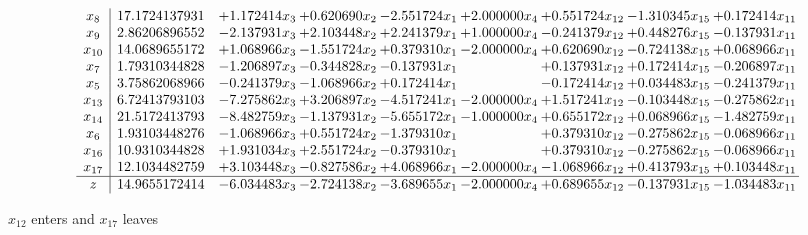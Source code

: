 \documentclass[10pt]{article}
\begin{document}
 \[\begin{array}{c| c c@{\hskip 2pt} c@{\hskip 2pt} c@{\hskip 2pt} c@{\hskip 2pt} c@{\hskip 2pt} c@{\hskip 2pt} c@{\hskip 2pt} }
 x_{8}   &  17.1724137931 & + 1.172414 x_{3} & + 0.620690 x_{2} & -2.551724 x_{1} & + 2.000000 x_{4} & + 0.551724 x_{12} & -1.310345 x_{15} & + 0.172414 x_{11}\\
 x_{9}   &  2.86206896552 & -2.137931 x_{3} & + 2.103448 x_{2} & + 2.241379 x_{1} & + 1.000000 x_{4} & -0.241379 x_{12} & + 0.448276 x_{15} & -0.137931 x_{11}\\
 x_{10}   &  14.0689655172 & + 1.068966 x_{3} & -1.551724 x_{2} & + 0.379310 x_{1} & -2.000000 x_{4} & + 0.620690 x_{12} & -0.724138 x_{15} & + 0.068966 x_{11}\\
 x_{7}   &  1.79310344828 & -1.206897 x_{3} & -0.344828 x_{2} & -0.137931 x_{1} &   & + 0.137931 x_{12} & + 0.172414 x_{15} & -0.206897 x_{11}\\
 x_{5}   &  3.75862068966 & -0.241379 x_{3} & -1.068966 x_{2} & + 0.172414 x_{1} &   & -0.172414 x_{12} & + 0.034483 x_{15} & -0.241379 x_{11}\\
 x_{13}   &  6.72413793103 & -7.275862 x_{3} & + 3.206897 x_{2} & -4.517241 x_{1} & -2.000000 x_{4} & + 1.517241 x_{12} & -0.103448 x_{15} & -0.275862 x_{11}\\
 x_{14}   &  21.5172413793 & -8.482759 x_{3} & -1.137931 x_{2} & -5.655172 x_{1} & -1.000000 x_{4} & + 0.655172 x_{12} & + 0.068966 x_{15} & -1.482759 x_{11}\\
 x_{6}   &  1.93103448276 & -1.068966 x_{3} & + 0.551724 x_{2} & -1.379310 x_{1} &   & + 0.379310 x_{12} & -0.275862 x_{15} & -0.068966 x_{11}\\
 x_{16}   &  10.9310344828 & + 1.931034 x_{3} & + 2.551724 x_{2} & -0.379310 x_{1} &   & + 0.379310 x_{12} & -0.275862 x_{15} & -0.068966 x_{11}\\
 x_{17}   &  12.1034482759 & + 3.103448 x_{3} & -0.827586 x_{2} & + 4.068966 x_{1} & -2.000000 x_{4} & -1.068966 x_{12} & + 0.413793 x_{15} & + 0.103448 x_{11}\\
\hline
z    &  14.9655172414 & -6.034483 x_{3} & -2.724138 x_{2} & -3.689655 x_{1} & -2.000000 x_{4} & + 0.689655 x_{12} & -0.137931 x_{15} & -1.034483 x_{11}\\
\end{array}\]


 $ x_{12} $ enters and $ x_{17} $ leaves 
\end{document}
